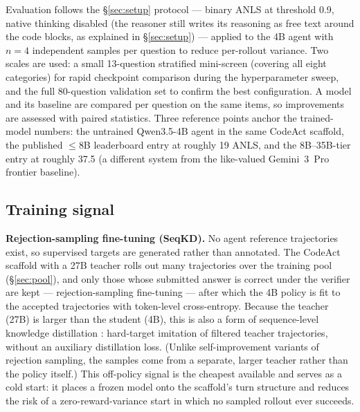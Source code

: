 Evaluation follows the \S\ref{sec:setup} protocol --- binary ANLS at threshold 0.9, native thinking disabled (the reasoner still writes its reasoning as free text around the code blocks, as explained in \S\ref{sec:setup}) --- applied to the 4B agent with $n{=}4$ independent samples per question to reduce per-rollout variance. Two scales are used: a small 13-question stratified mini-screen (covering all eight categories) for rapid checkpoint comparison during the hyperparameter sweep, and the full 80-question validation set to confirm the best configuration. A model and its baseline are compared per question on the same items, so improvements are assessed with paired statistics. Three reference points anchor the trained-model numbers: the untrained Qwen3.5-4B agent in the same CodeAct scaffold, the published $\leq$8B leaderboard entry at roughly 19 ANLS, and the 8B--35B-tier entry at roughly 37.5 (a different system from the like-valued Gemini~3~Pro frontier baseline).

\subsection{Training signal}

\textbf{Rejection-sampling fine-tuning (SeqKD).} No agent reference trajectories exist, so supervised targets are generated rather than annotated. The CodeAct scaffold with a 27B teacher rolls out many trajectories over the training pool (\S\ref{sec:pool}), and only those whose submitted answer is correct under the verifier are kept --- rejection-sampling fine-tuning \citep{rft} --- after which the 4B policy is fit to the accepted trajectories with token-level cross-entropy. Because the teacher (27B) is larger than the student (4B), this is also a form of sequence-level knowledge distillation \citep{seqkd}: hard-target imitation of filtered teacher trajectories, without an auxiliary distillation loss. (Unlike self-improvement variants of rejection sampling, the samples come from a separate, larger teacher rather than the policy itself.) This off-policy signal is the cheapest available and serves as a cold start: it places a frozen model onto the scaffold's turn structure and reduces the risk of a zero-reward-variance start in which no sampled rollout ever succeeds.

